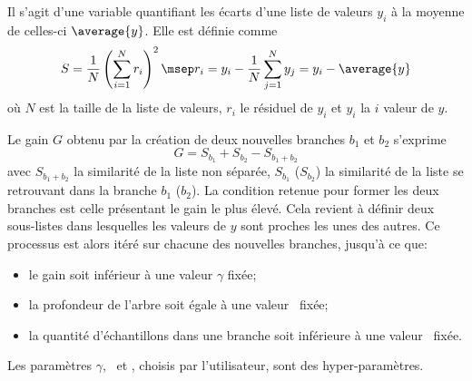 Il s'agit d'une variable quantifiant les écarts d'une liste de valeurs $y_i$ à la moyenne de celles-ci $\average{y}$.
Elle est définie comme
\begin{equation}
S = \frac{1}{N} \left(\sum_{i=1}^N r_{i} \right)^2
\msep
r_i = y_i - \frac{1}{N} \sum_{j=1}^N y_j = y_i - \average{y}
\end{equation}
où $N$ est la taille de la liste de valeurs,
$r_i$ le résiduel de $y_i$
et $y_{i}$ la $i$ valeur de $y$.
\par
Le gain $G$ obtenu par la création de deux nouvelles branches $b_1$ et $b_2$ s'exprime
\begin{equation}
G = S_{b_1} + S_{b_2} - S_{b_1+b_2}
\end{equation}
avec
$S_{b_1+b_2}$ la similarité de la liste non séparée,
$S_{b_1}$ ($S_{b_2}$) la similarité de la liste se retrouvant dans la branche $b_1$ ($b_2$).
La condition retenue pour former les deux branches est celle présentant le gain le plus élevé.
Cela revient à définir deux sous-listes dans lesquelles les valeurs de $y$ sont proches les unes des autres.
Ce processus est alors itéré sur chacune des nouvelles branches, jusqu'à ce que:
\begin{itemize}
\item le gain soit inférieur à une valeur $\gamma$ fixée;
\item la profondeur de l'arbre soit égale à une valeur \MaxDepth\ fixée;
\item la quantité d'échantillons dans une branche soit inférieure à une valeur \MinChildWeight\ fixée.
\end{itemize}
Les paramètres $\gamma$, \MaxDepth\ et \MinChildWeight, choisis par l'utilisateur, sont des hyper-paramètres.
